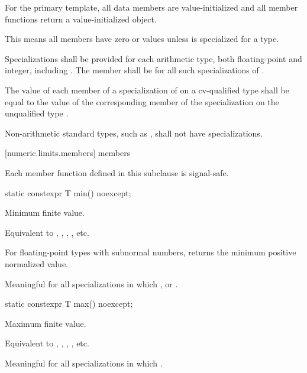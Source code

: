 \pnum
For the
primary template, all data members are value-initialized and all
member functions return a value-initialized object.
\begin{note}
This means all members have zero or  values
unless  is specialized for a type.
\end{note}

\pnum
Specializations shall be provided for each
arithmetic type,
both floating-point and integer, including
.
The member
shall be
for all such specializations of
.

\pnum
The value of each member of a specialization of
 on a cv-qualified type
 shall be equal to the value of the corresponding member of
the specialization on the unqualified type .

\pnum
Non-arithmetic standard types, such as
, shall not have specializations.

[numeric.limits.members]{ members}

\pnum
{}%
Each member function defined in this subclause is signal-safe.

%
\begin{itemdecl}
static constexpr T min() noexcept;
\end{itemdecl}

\begin{itemdescr}
\pnum
Minimum finite value.
\begin{footnote}
Equivalent to , ,
, , etc.
\end{footnote}

%
\pnum
For floating-point types with subnormal numbers, returns the minimum positive
normalized value.

\pnum
Meaningful for all specializations in which
,
or
.
\end{itemdescr}

%
\begin{itemdecl}
static constexpr T max() noexcept;
\end{itemdecl}

\begin{itemdescr}
\pnum
Maximum finite value.
\begin{footnote}
Equivalent to , ,
, , etc.
\end{footnote}

\pnum
Meaningful for all specializations in which
.
\end{itemdescr}

